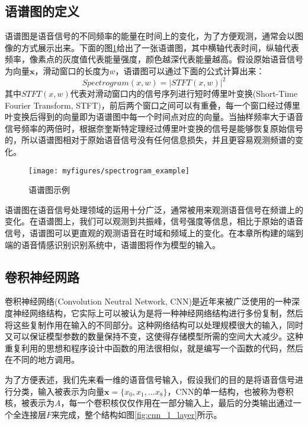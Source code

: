 \subsection{语谱图的定义}
\label{ssec:spectrogram}

语谱图是语音信号的不同频率的能量在时间上的变化，为了方便观测，通常会以图像的方式展示出来。下面的图\ref{fig:spectrogram_example}给出了一张语谱图，其中横轴代表时间，纵轴代表频率，像素点的灰度值代表能量强度，颜色越深代表能量越高。假设原始语音信号为向量$\mathbf{x}$，滑动窗口的长度为$w$，语谱图可以通过下面的公式计算出来：
\begin{equation}
\label{equ:spectrogram}
    Spectrogram(x, w) = |STFT(x, w)|^2
\end{equation}
其中$STFT(x, w)$代表对滑动窗口内的信号序列进行短时傅里叶变换(Short-Time Fourier Transform, STFT)，前后两个窗口之间可以有重叠，每一个窗口经过傅里叶变换后得到的向量即为语谱图中每一个时间点对应的向量。当抽样频率大于语音信号频率的两倍时，根据奈奎斯特定理经过傅里叶变换的信号是能够恢复原始信号的，所以语谱图相对于原始语音信号没有任何信息损失，并且更容易观测频谱的变化。

\begin{figure}[htb] %
    \centering
    \texttt{[image: myfigures/spectrogram\_example]}
    \caption{语谱图示例}
    \label{fig:spectrogram_example}
\end{figure}

语谱图在语音信号处理领域的运用十分广泛，通常被用来观测语音信号在频谱上的变化。在语谱图上，我们可以观测到共振峰，信号强度等信息，相比于原始的语音信号，语谱图可以更直观的观测语音在时域和频域上的变化。在本章所构建的端到端的语音情感识别识别系统中，语谱图将作为模型的输入。

\subsection{卷积神经网路}
\label{ssec:cnn}

卷积神经网络(Convolution Neutral Network, CNN)是近年来被广泛使用的一种深度神经网络结构，它实际上可以被认为是将一种神经网络结构进行多份复制，然后将这些复制作用在输入的不同部分。这种网络结构可以处理规模很大的输入，同时又可以保证模型参数的数量保持不变，这使得存储模型所需的空间大大减少。这种重复利用的思想和程序设计中函数的用法很相似，就是编写一个函数的代码，然后在不同的地方调用。

为了方便表述，我们先来看一维的语音信号输入，假设我们的目的是将语音信号进行分类，输入被表示为向量$\mathbf{x}=\{x_0,x_1,...x_8\}$，CNN的单一结构，也被称为卷积核，被表示为$A$，每一个卷积核仅仅作用在一部分输入上，最后的分类输出通过一个全连接层$F$来完成，整个结构如图\ref{fig:cnn_1_layer}所示。

